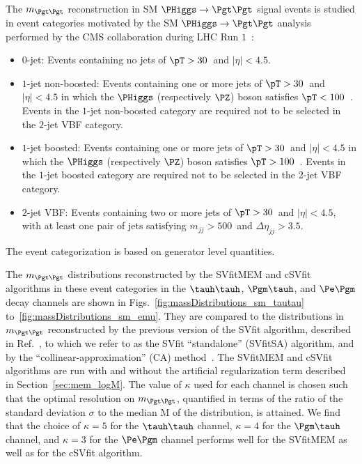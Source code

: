 The $m_{\Pgt\Pgt}$ reconstruction in SM $\PHiggs \to \Pgt\Pgt$ signal events is studied in event categories motivated by the
SM $\PHiggs \to \Pgt\Pgt$ analysis performed by the CMS collaboration during LHC Run $1$~\cite{HIG-13-004}:
\begin{itemize}
\item $0$-jet: 
  Events containing no jets of $\pT > 30$~\GeV and $\lvert \eta \rvert < 4.5$.
\item $1$-jet non-boosted:
  Events containing one or more jets of $\pT > 30$~\GeV and $\lvert \eta \rvert < 4.5$
  in which the $\PHiggs$ (respectively $\PZ$) boson satisfies $\pT < 100$~\GeV.
  Events in the $1$-jet non-boosted category are required not to be selected in the $2$-jet VBF category.
\item $1$-jet boosted:
  Events containing one or more jets of $\pT > 30$~\GeV and $\lvert \eta \rvert < 4.5$
  in which the $\PHiggs$ (respectively $\PZ$) boson satisfies $\pT > 100$~\GeV.
  Events in the $1$-jet boosted category are required not to be selected in the $2$-jet VBF category.
\item $2$-jet VBF:
  Events containing two or more jets of $\pT > 30$~\GeV and $\lvert \eta \rvert < 4.5$,
  with at least one pair of jets satisfying $m_{jj} > 500$~\GeV and $\Delta\eta_{jj} > 3.5$.
\end{itemize}
The event categorization is based on generator level quantities.

The $m_{\Pgt\Pgt}$ distributions reconstructed by the SVfitMEM and cSVfit algorithms in these event categories 
in the $\tauh\tauh$, $\Pgm\tauh$, and $\Pe\Pgm$ decay channels are shown in Figs.~\ref{fig:massDistributions_sm_tautau} to~\ref{fig:massDistributions_sm_emu}.
They are compared to the distributions in $m_{\Pgt\Pgt}$  reconstructed by the previous version of the
SVfit algorithm, described in Ref.~\cite{SVfit}, to which we refer to as the SVfit ``standalone'' (SVfitSA) algorithm,
and by the ``collinear-approximation'' (CA) method~\cite{massRecoCollinearApprox}.
The SVfitMEM and cSVfit algorithms are run with and without the artificial regularization term described in Section~\ref{sec:mem_logM}.
The value of $\kappa$ used for each channel is chosen such that the optimal resolution on $m_{\Pgt\Pgt}$, 
quantified in terms of the ratio of the standard deviation $\sigma$ to the median $\textrm{M}$ of the distribution,
is attained.
We find that the choice of $\kappa = 5$ for the $\tauh\tauh$ channel, $\kappa = 4$ for the $\Pgm\tauh$ channel,
and $\kappa = 3$ for the $\Pe\Pgm$ channel performs well for the SVfitMEM as well as for the cSVfit algorithm.

